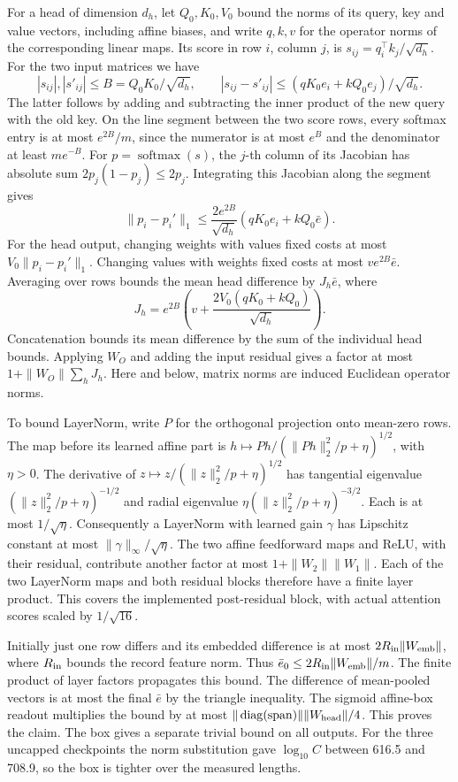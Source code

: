 \documentclass[11pt,letterpaper]{article}
\DeclareMathOperator{\diag}{diag}
\DeclareMathOperator{\softmax}{softmax}
\begin{document}
For a head of dimension \(d_h\), let \(Q_0,K_0,V_0\) bound the norms
of its query, key and value vectors, including affine biases, and
write \(q,k,v\) for the operator norms of the corresponding linear
maps. Its score in row \(i\), column \(j\), is
\(s_{ij}=q_i^\top k_j/\sqrt{d_h}\). For the two input matrices we have
\[
 |s_{ij}|,|s'_{ij}|\le B=Q_0K_0/\sqrt{d_h},
 \qquad |s_{ij}-s'_{ij}|\le
 (qK_0e_i+kQ_0e_j)/\sqrt{d_h}.
\]
The latter follows by adding and subtracting the inner product of
the new query with the old key. On the line segment between the two
score rows, every softmax entry is at most \(e^{2B}/m\), since the
numerator is at most \(e^B\) and the denominator at least \(me^{-B}\).
For \(p=\softmax(s)\), the \(j\)-th column of its Jacobian has absolute
sum \(2p_j(1-p_j)\le2p_j\). Integrating this Jacobian along the segment
gives
\[
 \lVert p_i-p_i'\rVert_1
 \le \frac{2e^{2B}}{\sqrt{d_h}}(qK_0 e_i+kQ_0\bar e).
\]
For the head output, changing weights with values fixed costs at
most \(V_0\lVert p_i-p_i'\rVert_1\). Changing values with weights fixed
costs at most \(ve^{2B}\bar e\). Averaging over rows bounds the mean
head difference by \(J_h\bar e\), where
\[
 J_h=e^{2B}\left(v+\frac{2V_0(qK_0+kQ_0)}{\sqrt{d_h}}\right).
\]
Concatenation bounds its mean difference by the sum of the individual
head bounds. Applying \(W_O\) and adding the input residual gives a
factor at most \(1+\|W_O\|\sum_hJ_h\). Here and below, matrix norms
are induced Euclidean operator norms.

To bound LayerNorm, write \(P\) for the orthogonal projection onto
mean-zero rows. The map before its learned affine part is
\(h\mapsto Ph/(\|Ph\|_2^2/p+\eta)^{1/2}\), with \(\eta>0\).
The derivative of \(z\mapsto z/(\|z\|_2^2/p+\eta)^{1/2}\)
has tangential eigenvalue \((\|z\|_2^2/p+\eta)^{-1/2}\) and radial
eigenvalue \(\eta(\|z\|_2^2/p+\eta)^{-3/2}\). Each is at most
\(1/\sqrt\eta\). Consequently a LayerNorm with learned gain \(\gamma\)
has Lipschitz constant at most \(\|\gamma\|_\infty/\sqrt\eta\).
The two affine feedforward maps and ReLU, with their residual,
contribute another factor at most \(1+\|W_2\|\|W_1\|\).
Each of the two LayerNorm maps and both residual blocks therefore
have a finite layer product. This covers the implemented post-residual
block, with actual attention scores scaled by \(1/\sqrt{16}\).

Initially just one row differs and its embedded difference is at most
\(2R_{\rm in}\|W_{\rm emb}\|\), where \(R_{\rm in}\) bounds the record
feature norm. Thus \(\bar e_0\le 2R_{\rm in}\|W_{\rm emb}\|/m\).
The finite product of layer factors propagates this bound. The difference
of mean-pooled vectors is at most the final \(\bar e\) by the triangle
inequality. The sigmoid affine-box readout multiplies the bound by at
most \(\|\diag(\mathrm{span})\|\|W_{\rm head}\|/4\). This proves the
claim. The box gives a separate trivial bound on all outputs. For the
three uncapped checkpoints the norm substitution gave
\(\log_{10} C\) between 616.5 and 708.9, so the box is tighter over
the measured lengths.
\end{document}
